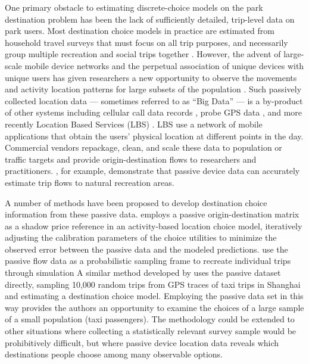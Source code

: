 \documentclass[3p, authoryear]{elsarticle} %
\begin{document}
One primary obstacle to estimating discrete-choice models on the park
destination problem has been the lack of sufficiently detailed, trip-level data
on park users. Most destination choice models in practice are estimated from household travel
surveys that must focus on all trip purposes, and necessarily group multiple
recreation and social trips together \citep{nchrp716}. However, the advent of large-scale
mobile device networks and the perpetual association of unique devices with
unique users has given researchers a new opportunity to observe the movements
and activity location patterns for large subsets of the population
\citep{Naboulsi2016}. Such passively collected location data --- sometimes referred
to as ``Big Data'' --- is a by-product of other systems including cellular call
data records \citep[e.g.,][]{Bolla2000, Calabrese2011}, probe GPS data \citep{Huang2015}, and more recently Location Based
Services (LBS) \citep{Roll2019, Komanduri2017}. LBS use a network of mobile
applications that obtain the users' physical location at different points in the
day. Commercial vendors repackage, clean, and scale these data to population or
traffic targets and provide origin-destination flows to researchers and
practitioners. \citet{Monz2019}, for example, demonstrate that passive device data can
accurately estimate trip flows to natural recreation areas.

A number of methods have been proposed to develop destination choice
information from these passive data.
\citet{Bernardin2018} employs a passive origin-destination matrix as a shadow price
reference in an activity-based location choice model, iteratively adjusting the
calibration parameters of the choice
utilities to minimize the observed error between the passive data and the modeled
predictions.
\citet{tf_idea} use the passive flow data
as a probabilistic sampling frame to recreate individual trips through simulation
A similar method developed by \citet{Zhu2018} uses the passive dataset
directly, sampling 10,000 random trips from GPS traces of taxi trips in Shanghai
and estimating a destination choice model. Employing the passive data set in
this way provides the authors an opportunity to examine the choices of a large
sample of a small population (taxi passengers). The \citet{Zhu2018} methodology could
be extended to other situations where collecting a statistically relevant
survey sample would be prohibitively difficult, but where passive device
location data reveals which destinations people choose among many observable
options.
\end{document}
